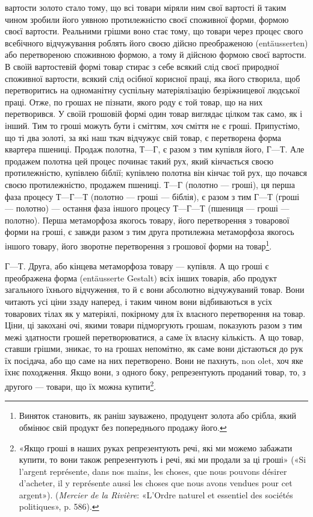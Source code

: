 \parcont{}  %
вартости золото стало тому, що всі товари міряли ним свої вартості
й таким чином зробили його уявною протилежністю своєї
споживної форми, формою своєї вартости. Реальними грішми
воно стає тому, що товари через процес свого всебічного відчужування
роблять його своєю дійсно преображеною (entäusserten)
або перетвореною споживною формою, а тому й дійсною формою
своєї вартости. В своїй вартостевій формі товар стирає з себе
всякий слід своєї природної споживної вартости, всякий слід
осібної корисної праці, яка його створила, щоб перетворитись
на одноманітну суспільну матеріялізацію безріжницевої людської
праці. Отже, по грошах не пізнати, якого роду є той товар,
що на них перетворився. У своїй грошовій формі один товар
виглядає цілком так само, як і інший. Тим то гроші можуть бути
і сміттям, хоч сміття не є гроші. Припустімо, що ті два золоті,
за які наш ткач відчужує свій товар, є перетворена форма квартера
пшениці. Продаж полотна, $Т — Г$, є разом з тим купівля
його, $Г — Т$. Але продажем полотна цей процес починає такий
рух, який кінчається своєю протилежністю, купівлею біблії;
купівлею полотна він кінчає той рух, що почався своєю протилежністю,
продажем пшениці. $Т — Г$ (полотно — гроші), ця перша
фаза процесу $Т — Г — Т$ (полотно — гроші — біблія), є разом
з тим $Г — Т$ (гроші — полотно) — остання фаза іншого процесу
$Т — Г — Т$ (пшениця — гроші — полотно). Перша метаморфоза
якогось товару, його перетворення з товарової форми на гроші,
є завжди разом з тим друга протилежна метаморфоза якогось
іншого товару, його зворотне перетворення з грошової форми на
товар\footnote{
Виняток становить, як раніш зауважено, продуцент золота або
срібла, який обмінює свій продукт без попереднього продажу його.
}.

$Г — Т$. Друга, або кінцева метаморфоза товару — купівля.
А що гроші є преображена форма (entäusserte Gestalt) всіх інших
товарів, або продукт загального їхнього відчуження, то й є вони
абсолютно відчужуваний товар. Вони читають усі ціни ззаду
наперед, і таким чином вони відбиваються в усіх товарових тілах
як у матеріялі, покірному для їх власного перетворення на товар.
Ціни, ці закохані очі, якими товари підморгують грошам, показують
разом з тим межі здатности грошей перетворюватися, а
саме їх власну кількість. А що товар, ставши грішми, зникає,
то на грошах непомітно, як саме вони дістаються до рук їх посідача,
або що саме на них перетворено. Вони не пахнуть, non olet,
хоч яке їхнє походження. Якщо вони, з одного боку, репрезентують
проданий товар, то, з другого — товари, що їх можна
купити\footnote{
«Якщо гроші в наших руках репрезентують речі, які ми можемо
забажати купити, то вони також репрезентують і речі, які ми продали за
ці гроші» («Si l’argent représente, dans nos mains, les choses, que nous
pouvons désirer d’acheter, il y représente aussi les choses que nous avons
vendues pour cet argent»). (\emph{Mercier de la Rivière}: «L’Ordre naturel et
essentiel des sociétés politiques», p. 586).
}.
